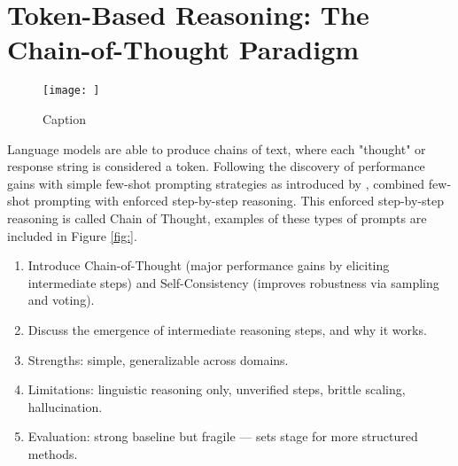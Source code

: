 \documentclass[project]{bsu-cs}  %
\begin{document}
\section{Token-Based Reasoning: The Chain-of-Thought Paradigm}\label{sec:CoT}
\begin{figure}
    \centering
    \texttt{[image: ]}
    \caption{Caption}
    \label{fig:placeholder}
\end{figure}
Language models are able to produce chains of text, where each "thought" or response string is considered a token. Following the discovery of performance gains with simple few-shot prompting strategies as introduced by \citet{DBLP:journals/corr/abs-2005-14165}, \citet{DBLP:journals/corr/abs-2201-11903} combined few-shot prompting with enforced step-by-step reasoning. This enforced step-by-step reasoning is called Chain of Thought, examples of these types of prompts are included in Figure \ref{fig:}. 

\begin{enumerate}
    \item Introduce Chain-of-Thought \citep{DBLP:journals/corr/abs-2201-11903} (major performance gains by eliciting intermediate steps) and Self-Consistency \citep{wang2023selfconsistencyimproveschainthought} (improves robustness via sampling and voting).

    

    \item Discuss the emergence of intermediate reasoning steps, and why it works.

    \item Strengths: simple, generalizable across domains.

    \item Limitations: linguistic reasoning only, unverified steps, brittle scaling, hallucination.

    \item Evaluation: strong baseline but fragile — sets stage for more structured methods.
    
\end{enumerate}
% 
%
%
% 
\end{document}
